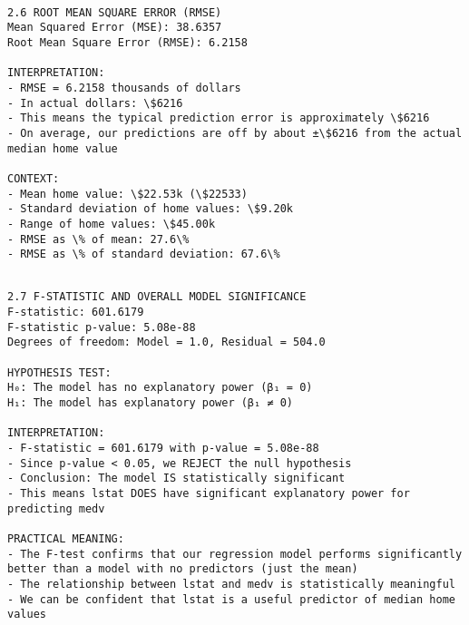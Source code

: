 \documentclass[8pt, twocolumn]{extarticle}
\begin{document}
    \begin{Verbatim}[commandchars=\\\{\}]

2.6 ROOT MEAN SQUARE ERROR (RMSE)
Mean Squared Error (MSE): 38.6357
Root Mean Square Error (RMSE): 6.2158

INTERPRETATION:
- RMSE = 6.2158 thousands of dollars
- In actual dollars: \$6216
- This means the typical prediction error is approximately \$6216
- On average, our predictions are off by about ±\$6216 from the actual median home value

CONTEXT:
- Mean home value: \$22.53k (\$22533)
- Standard deviation of home values: \$9.20k
- Range of home values: \$45.00k
- RMSE as \% of mean: 27.6\%
- RMSE as \% of standard deviation: 67.6\%
    \end{Verbatim}

    \begin{Verbatim}[commandchars=\\\{\}]

2.7 F-STATISTIC AND OVERALL MODEL SIGNIFICANCE
F-statistic: 601.6179
F-statistic p-value: 5.08e-88
Degrees of freedom: Model = 1.0, Residual = 504.0

HYPOTHESIS TEST:
H₀: The model has no explanatory power (β₁ = 0)
H₁: The model has explanatory power (β₁ ≠ 0)

INTERPRETATION:
- F-statistic = 601.6179 with p-value = 5.08e-88
- Since p-value < 0.05, we REJECT the null hypothesis
- Conclusion: The model IS statistically significant
- This means lstat DOES have significant explanatory power for predicting medv

PRACTICAL MEANING:
- The F-test confirms that our regression model performs significantly better than a model with no predictors (just the mean)
- The relationship between lstat and medv is statistically meaningful
- We can be confident that lstat is a useful predictor of median home values
    \end{Verbatim}
\end{document}
